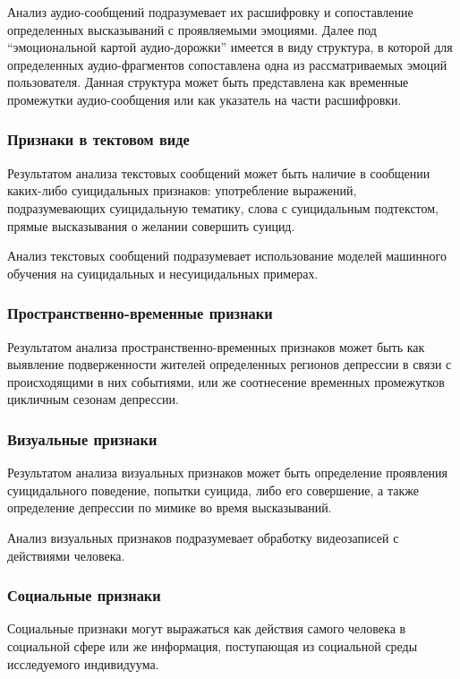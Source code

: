 Анализ аудио-сообщений подразумевает их расшифровку и сопоставление определенных высказываний с проявляемыми эмоциями. Далее под ``эмоциональной картой аудио-дорожки'' имеется в виду структура, в которой для определенных аудио-фрагментов сопоставлена одна из рассматриваемых эмоций пользователя. Данная структура может быть представлена как временные промежутки аудио-сообщения или как указатель на части расшифровки. 

\subsubsection{Признаки в тектовом виде}

Результатом анализа текстовых сообщений может быть наличие в сообщении каких-либо суицидальных признаков: употребление выражений, подразумевающих суицидальную тематику, слова с суицидальным подтекстом, прямые высказывания о желании совершить суицид.

Анализ текстовых сообщений подразумевает использование моделей машинного обучения на суицидальных и несуицидальных примерах.

\subsubsection{Пространственно-временные признаки}

Результатом анализа пространственно-временных признаков может быть как выявление подверженности жителей определенных регионов депрессии в связи с происходящими в них событиями, или же соотнесение временных промежутков цикличным сезонам депрессии.

\subsubsection{Визуальные признаки}

Результатом анализа визуальных признаков может быть определение проявления суицидального поведение, попытки суицида, либо его совершение, а также определение депрессии по мимике во время высказываний.

Анализ визуальных признаков подразумевает обработку видеозаписей с действиями человека.

\subsubsection{Социальные признаки}

Социальные признаки могут выражаться как действия самого человека в социальной сфере или же информация, поступающая из социальной среды исследуемого индивидуума.

